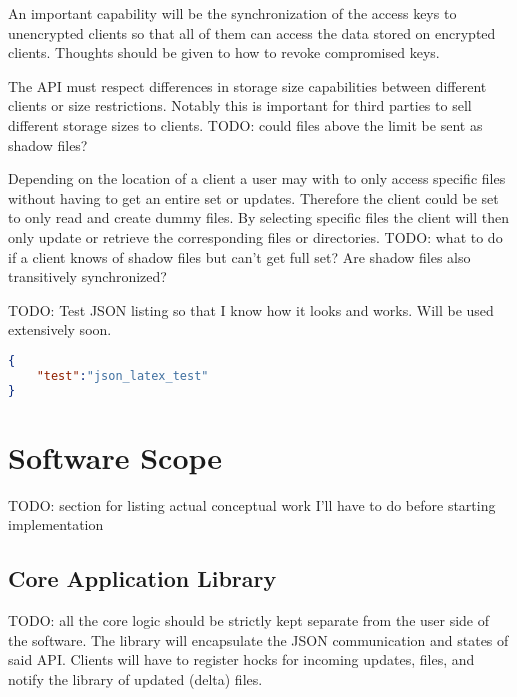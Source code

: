 \begin{description}[leftmargin=2em,style=nextline,noitemsep,nolistsep]
\item[Encryption Key Management]
    An important capability will be the synchronization of the access keys to unencrypted clients so that all of them can access the data stored on encrypted clients.
    Thoughts should be given to how to revoke compromised keys.
\item[Space Management]
    The API must respect differences in storage size capabilities between different clients or size restrictions.
    Notably this is important for third parties to sell different storage sizes to clients.
    TODO: could files above the limit be sent as shadow files?
\item[Shadow Files]
    Depending on the location of a client a user may with to only access specific files without having to get an entire set or updates.
    Therefore the client could be set to only read and create dummy files.
    By selecting specific files the client will then only update or retrieve the corresponding files or directories.
    TODO: what to do if a client knows of shadow files but can't get full set?
    Are shadow files also transitively synchronized?
\end{description}

TODO: Test JSON listing so that I know how it looks and works.
Will be used extensively soon.

\begin{lstlisting}[language=json,firstnumber=0]
{
	"test":"json_latex_test"
}
\end{lstlisting}

\section{Software Scope}

TODO: section for listing actual conceptual work I'll have to do before starting implementation

\subsection{Core Application Library}

TODO: all the core logic should be strictly kept separate from the user side of the software.
The library will encapsulate the JSON communication and states of said API.
Clients will have to register hocks for incoming updates, files, and notify the library of updated (delta) files.

